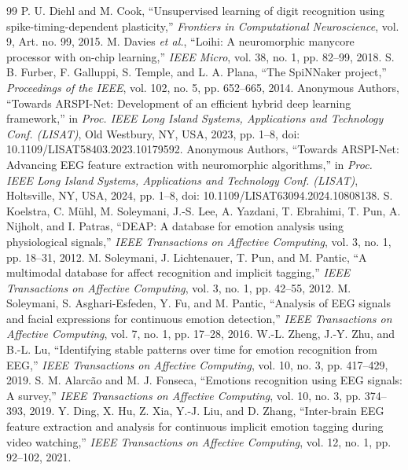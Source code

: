 \documentclass[journal]{IEEEtran}
\begin{document}
\begin{thebibliography}{99}
 P. U. Diehl and M. Cook, ``Unsupervised learning of digit recognition using spike-timing-dependent plasticity,'' \emph{Frontiers in Computational Neuroscience}, vol. 9, Art. no. 99, 2015.
 M. Davies \emph{et al.}, ``Loihi: A neuromorphic manycore processor with on-chip learning,'' \emph{IEEE Micro}, vol. 38, no. 1, pp. 82--99, 2018.
 S. B. Furber, F. Galluppi, S. Temple, and L. A. Plana, ``The SpiNNaker project,'' \emph{Proceedings of the IEEE}, vol. 102, no. 5, pp. 652--665, 2014.
 Anonymous Authors, ``Towards ARSPI-Net: Development of an efficient hybrid deep learning framework,'' in \emph{Proc. IEEE Long Island Systems, Applications and Technology Conf. (LISAT)}, Old Westbury, NY, USA, 2023, pp. 1--8, doi: 10.1109/LISAT58403.2023.10179592.
 Anonymous Authors, ``Towards ARSPI-Net: Advancing EEG feature extraction with neuromorphic algorithms,'' in \emph{Proc. IEEE Long Island Systems, Applications and Technology Conf. (LISAT)}, Holtsville, NY, USA, 2024, pp. 1--8, doi: 10.1109/LISAT63094.2024.10808138.
 S. Koelstra, C. M\"uhl, M. Soleymani, J.-S. Lee, A. Yazdani, T. Ebrahimi, T. Pun, A. Nijholt, and I. Patras, ``DEAP: A database for emotion analysis using physiological signals,'' \emph{IEEE Transactions on Affective Computing}, vol. 3, no. 1, pp. 18--31, 2012.
 M. Soleymani, J. Lichtenauer, T. Pun, and M. Pantic, ``A multimodal database for affect recognition and implicit tagging,'' \emph{IEEE Transactions on Affective Computing}, vol. 3, no. 1, pp. 42--55, 2012.
 M. Soleymani, S. Asghari-Esfeden, Y. Fu, and M. Pantic, ``Analysis of EEG signals and facial expressions for continuous emotion detection,'' \emph{IEEE Transactions on Affective Computing}, vol. 7, no. 1, pp. 17--28, 2016.
 W.-L. Zheng, J.-Y. Zhu, and B.-L. Lu, ``Identifying stable patterns over time for emotion recognition from EEG,'' \emph{IEEE Transactions on Affective Computing}, vol. 10, no. 3, pp. 417--429, 2019.
 S. M. Alarc\~{a}o and M. J. Fonseca, ``Emotions recognition using EEG signals: A survey,'' \emph{IEEE Transactions on Affective Computing}, vol. 10, no. 3, pp. 374--393, 2019.
 Y. Ding, X. Hu, Z. Xia, Y.-J. Liu, and D. Zhang, ``Inter-brain EEG feature extraction and analysis for continuous implicit emotion tagging during video watching,'' \emph{IEEE Transactions on Affective Computing}, vol. 12, no. 1, pp. 92--102, 2021.

\end{thebibliography}
\end{document}
